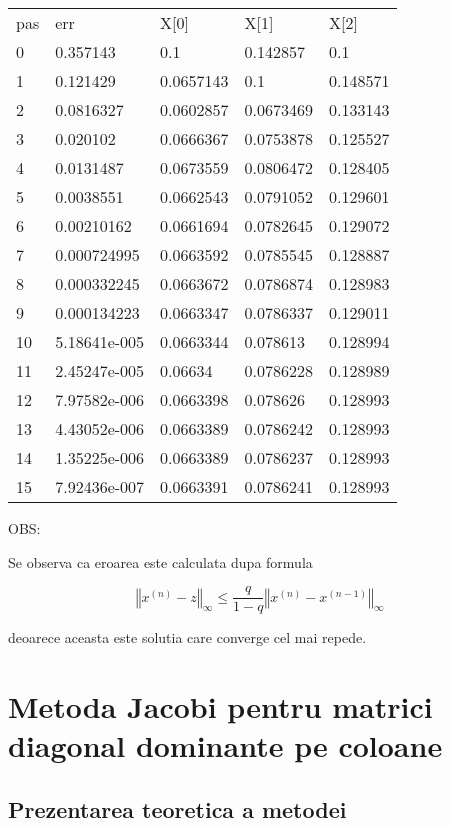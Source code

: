 \documentclass[a4paper,twoside]{book}
\begin{document}
\begin{tabular}{lllll}
pas & err & X[0] & X[1] & X[2] \\ 
0 & 0.357143 & 0.1 & 0.142857 & 0.1 \\ 
1 & 0.121429 & 0.0657143 & 0.1 & 0.148571 \\ 
2 & 0.0816327 & 0.0602857 & 0.0673469 & 0.133143 \\ 
3 & 0.020102 & 0.0666367 & 0.0753878 & 0.125527 \\ 
4 & 0.0131487 & 0.0673559 & 0.0806472 & 0.128405 \\ 
5 & 0.0038551 & 0.0662543 & 0.0791052 & 0.129601 \\ 
6 & 0.00210162 & 0.0661694 & 0.0782645 & 0.129072 \\ 
7 & 0.000724995 & 0.0663592 & 0.0785545 & 0.128887 \\ 
8 & 0.000332245 & 0.0663672 & 0.0786874 & 0.128983 \\ 
9 & 0.000134223 & 0.0663347 & 0.0786337 & 0.129011 \\ 
10 & 5.18641e-005 & 0.0663344 & 0.078613 & 0.128994 \\ 
11 & 2.45247e-005 & 0.06634 & 0.0786228 & 0.128989 \\ 
12 & 7.97582e-006 & 0.0663398 & 0.078626 & 0.128993 \\ 
13 & 4.43052e-006 & 0.0663389 & 0.0786242 & 0.128993 \\ 
14 & 1.35225e-006 & 0.0663389 & 0.0786237 & 0.128993 \\ 
15 & 7.92436e-007 & 0.0663391 & 0.0786241 & 0.128993%
\end{tabular}

OBS:

Se observa ca eroarea este calculata dupa formula

\begin{equation*}
\left\Vert x^{(n)}-z\right\Vert _{\infty }\leq \frac{q}{1-q}\left\Vert
x^{(n)}-x^{(n-1)}\right\Vert _{\infty }
\end{equation*}

deoarece aceasta este solutia care converge cel mai repede.

\section{Metoda Jacobi pentru matrici diagonal dominante pe coloane}

\subsection{Prezentarea teoretica a metodei}
\end{document}
